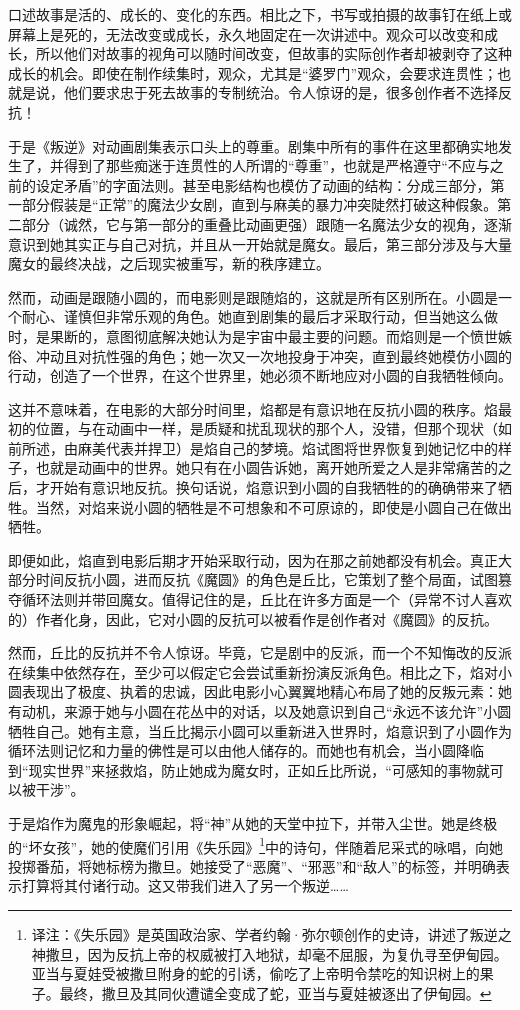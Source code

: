 口述故事是活的、成长的、变化的东西。相比之下，书写或拍摄的故事钉在纸上或屏幕上是死的，无法改变或成长，永久地固定在一次讲述中。观众可以改变和成长，所以他们对故事的视角可以随时间改变，但故事的实际创作者却被剥夺了这种成长的机会。即使在制作续集时，观众，尤其是“婆罗门”观众，会要求连贯性；也就是说，他们要求忠于死去故事的专制统治。令人惊讶的是，很多创作者不选择反抗！

于是《叛逆》对动画剧集表示口头上的尊重。剧集中所有的事件在这里都确实地发生了，并得到了那些痴迷于连贯性的人所谓的“尊重”，也就是严格遵守“不应与之前的设定矛盾”的字面法则。甚至电影结构也模仿了动画的结构：分成三部分，第一部分假装是“正常”的魔法少女剧，直到与麻美的暴力冲突陡然打破这种假象。第二部分（诚然，它与第一部分的重叠比动画更强）跟随一名魔法少女的视角，逐渐意识到她其实正与自己对抗，并且从一开始就是魔女。最后，第三部分涉及与大量魔女的最终决战，之后现实被重写，新的秩序建立。

然而，动画是跟随小圆的，而电影则是跟随焰的，这就是所有区别所在。小圆是一个耐心、谨慎但非常乐观的角色。她直到剧集的最后才采取行动，但当她这么做时，是果断的，意图彻底解决她认为是宇宙中最主要的问题。而焰则是一个愤世嫉俗、冲动且对抗性强的角色；她一次又一次地投身于冲突，直到最终她模仿小圆的行动，创造了一个世界，在这个世界里，她必须不断地应对小圆的自我牺牲倾向。

这并不意味着，在电影的大部分时间里，焰都是有意识地在反抗小圆的秩序。焰最初的位置，与在动画中一样，是质疑和扰乱现状的那个人，没错，但那个现状（如前所述，由麻美代表并捍卫）是焰自己的梦境。焰试图将世界恢复到她记忆中的样子，也就是动画中的世界。她只有在小圆告诉她，离开她所爱之人是非常痛苦的之后，才开始有意识地反抗。换句话说，焰意识到小圆的自我牺牲的的确确带来了牺牲。当然，对焰来说小圆的牺牲是不可想象和不可原谅的，即使是小圆自己在做出牺牲。

即便如此，焰直到电影后期才开始采取行动，因为在那之前她都没有机会。真正大部分时间反抗小圆，进而反抗《魔圆》的角色是丘比，它策划了整个局面，试图篡夺循环法则并带回魔女。值得记住的是，丘比在许多方面是一个（异常不讨人喜欢的）作者化身，因此，它对小圆的反抗可以被看作是创作者对《魔圆》的反抗。

然而，丘比的反抗并不令人惊讶。毕竟，它是剧中的反派，而一个不知悔改的反派在续集中依然存在，至少可以假定它会尝试重新扮演反派角色。相比之下，焰对小圆表现出了极度、执着的忠诚，因此电影小心翼翼地精心布局了她的反叛元素：她有动机，来源于她与小圆在花丛中的对话，以及她意识到自己“永远不该允许”小圆牺牲自己。她有主意，当丘比揭示小圆可以重新进入世界时，焰意识到了小圆作为循环法则记忆和力量的佛性是可以由他人储存的。而她也有机会，当小圆降临到“现实世界”来拯救焰，防止她成为魔女时，正如丘比所说，“可感知的事物就可以被干涉”。

于是焰作为魔鬼的形象崛起，将“神”从她的天堂中拉下，并带入尘世。她是终极的“坏女孩”，她的使魔们引用《失乐园》\footnote{译注：《失乐园》是英国政治家、学者约翰·弥尔顿创作的史诗，讲述了叛逆之神撒旦，因为反抗上帝的权威被打入地狱，却毫不屈服，为复仇寻至伊甸园。亚当与夏娃受被撒旦附身的蛇的引诱，偷吃了上帝明令禁吃的知识树上的果子。最终，撒旦及其同伙遭谴全变成了蛇，亚当与夏娃被逐出了伊甸园。}中的诗句，伴随着尼采式的咏唱，向她投掷番茄，将她标榜为撒旦。她接受了“恶魔”、“邪恶”和“敌人”的标签，并明确表示打算将其付诸行动。这又带我们进入了另一个叛逆……